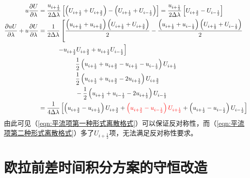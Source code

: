 \documentclass{ctexart}
\begin{document}
\begin{appendix}
\begin{align}
  u \frac{\partial U}{\partial \lambda} & = \frac{u_{i+\frac{1}{2}}}{2 \Delta{\lambda}} \left[ \left( U_{i+\frac{1}{2}} + U_{i+\frac{3}{2}} \right) - \left( U_{i+\frac{1}{2}} + U_{i-\frac{1}{2}} \right) \right] = \frac{u_{i+\frac{1}{2}}}{2 \Delta{\lambda}} \left[ U_{i+\frac{3}{2}} - U_{i-\frac{1}{2}} \right] \nonumber \\
  \frac{\partial u U}{\partial \lambda} + u \frac{\partial U}{\partial \lambda} & = \frac{1}{2 \Delta{\lambda}} \left[ \frac{\left( u_{i+\frac{1}{2}} + u_{i+\frac{3}{2}} \right) \left( U_{i+\frac{1}{2}} + U_{i+\frac{3}{2}} \right)}{2} - \frac{\left( u_{i+\frac{1}{2}} + u_{i-\frac{1}{2}} \right) \left( U_{i+\frac{1}{2}} + U_{i-\frac{1}{2}} \right)}{2} \right. \nonumber \\
  & \quad\quad\quad \left. - u_{i+\frac{1}{2}} U_{i+\frac{3}{2}} + u_{i+\frac{1}{2}} U_{i-\frac{1}{2}} \right] \nonumber \\
  & \quad\quad\quad\quad\quad\quad  \frac{1}{2} \left( u_{i+\frac{1}{2}} + u_{i+\frac{3}{2}} - u_{i+\frac{1}{2}} - u_{i-\frac{1}{2}} \right) U_{i+\frac{1}{2}} \nonumber \\{}
  & \quad\quad\quad\quad\quad\quad  \frac{1}{2} \left( u_{i+\frac{1}{2}} + u_{i+\frac{3}{2}} - 2 u_{i+\frac{1}{2}} \right) U_{i+\frac{3}{2}} \nonumber \\
  & \quad\quad\quad\quad\quad\quad  - \frac{1}{2} \left( u_{i+\frac{1}{2}} + u_{i-\frac{1}{2}} - 2 u_{i+\frac{1}{2}} \right) U_{i-\frac{1}{2}} \nonumber \\
  & = \frac{1}{4 \Delta{\lambda}} \left[ \left( u_{i+\frac{3}{2}} - u_{i+\frac{1}{2}} \right) U_{i+\frac{3}{2}} + {\color{red}\left( u_{i+\frac{3}{2}} - u_{i-\frac{1}{2}} \right) U_{i+\frac{1}{2}}} + \left( u_{i+\frac{1}{2}} - u_{i-\frac{1}{2}} \right) U_{i-\frac{1}{2}} \right] \label{eqn:平流项第二种形式离散格式}
\end{align}
由此可见（\ref{eqn:平流项第一种形式离散格式}）可以保证反对称性，而（\ref{eqn:平流项第二种形式离散格式}）多了$U_{i+\frac{1}{2}}$项，无法满足反对称性要求。

\section{欧拉前差时间积分方案的守恒改造}


\end{appendix}
\end{document}
